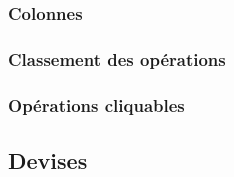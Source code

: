 \subsubsection{Colonnes\label{reportscreation-display-transactions-coltitles}}


\subsubsection{Classement des opérations}

\subsubsection{Opérations cliquables\label{reportscreation-display-transactions-clickable}}

\subsection{Devises\label{reportscreation-display-currencies}}


